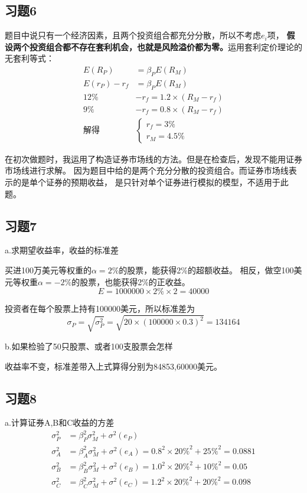 \documentclass{article}
\begin{document}
\subsection*{习题6}
题目中说只有一个经济因素，且两个投资组合都充分分散，所以不考虑$e_i$项，
\textbf{假设两个投资组合都不存在套利机会，也就是风险溢价都为零。}运用套利定价理论的无套利等式：
\begin{align}
    E(R_P)&=\beta_PE(R_M)\\
    E(r_P)-r_f&=\beta_PE(R_M)\\
    12\%&-r_f=1.2\times (R_M-r_f)\\
    9\%&-r_f=0.8\times (R_M-r_f)\\
    \text{解得}&\begin{cases}
        r_f=3\%\\
        r_M=4.5\%
    \end{cases}
\end{align}

在初次做题时，我运用了构造证券市场线的方法。但是在检查后，发现不能用证券市场线进行求解。
因为题目中给的是两个充分分散的投资组合。而证券市场线表示的是单个证券的预期收益，
是只针对单个证券进行模拟的模型，不适用于此题。





\subsection*{习题7}
a.求期望收益率，收益的标准差

买进100万美元等权重的$\alpha=2\%$的股票，能获得2\%的超额收益。
相反，做空100美元等权重$\alpha=-2\%$的股票，也能获得2\%的正收益。
\[E=1000000\times 2\%\times 2=40000 \]

投资者在每个股票上持有100000美元，所以标准差为
\[\sigma_P=\sqrt{\sigma^2_P}=\sqrt{20\times {(100000\times 0.3)}^2}=134164\]

b.如果检验了50只股票、或者100支股票会怎样

收益率不变，标准差带入上式算得分别为84853,60000美元。
 
\subsection*{习题8}
a.计算证券A,B和C收益的方差
\begin{align}
    \sigma_P^2&=\beta_P^2\sigma_M^2+\sigma^2(e_P)\\
    \sigma_A^2&=\beta_A^2\sigma_M^2+\sigma^2(e_A)=0.8^2\times 20\%^2+25\%^2=0.0881\\
    \sigma_B^2&=\beta_B^2\sigma_M^2+\sigma^2(e_B)=1.0^2\times 20\%^2+10\%^2=0.05\\
    \sigma_C^2&=\beta_C^2\sigma_M^2+\sigma^2(e_C)=1.2^2\times 20\%^2+20\%^2=0.098
\end{align}
\end{document}
